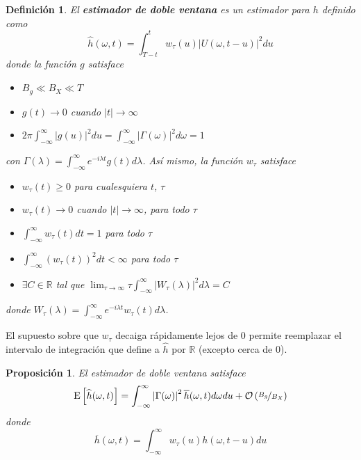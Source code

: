 \documentclass[12pt,letterpaper]{book}
\newtheorem{definicion}{Definición}[chapter]
\newtheorem{proposicion}[teorema]{Proposición}
\newcommand{\R}{\mathbb{R}}
\newcommand{\intR}{\int_{-\infty}^{\infty}}
\newcommand{\E}[1]{\mathrm{E}\left[ #1 \right]}
\newcommand{\abso}[1]{\left| #1 \right|}
\newcommand{\orden}[1]{\mathcal{O}\left( #1 \right)}
\begin{document}
\begin{definicion}
El \textbf{estimador de doble ventana} es un estimador para $h$ definido como
\begin{equation}
\widehat{h}(\omega, t) = \int_{T-t}^{t} w_\tau (u) \abso{U(\omega,t-u)}^{2} du
\end{equation}
donde la función $g$ satisface
\begin{itemize}
\item $B_g \ll B_X \ll T$
\item $g(t) \rightarrow 0$ cuando $\abso{t} \rightarrow \infty$
\item $2\pi \intR \abso{g(u)}^{2} du = \intR \abso{\Gamma(\omega)}^{2} d\omega = 1$
\end{itemize}
con $\Gamma(\lambda) = \intR e^{-i \lambda t} g(t) d\lambda$. Así mismo, la función $w_\tau$ satisface
\begin{itemize}
\item $w_\tau(t) \geq 0$ para cualesquiera $t$, $\tau$
\item $w_\tau(t) \rightarrow 0$ cuando $\abso{t} \rightarrow \infty$, para todo $\tau$
\item $\displaystyle \intR w_\tau(t) dt = 1$ para todo $\tau$
\item $\displaystyle \intR \left( w_\tau(t) \right)^{2} dt < \infty$ para todo $\tau$
\item $\exists C \in \R$ tal que  
$\displaystyle \lim_{\tau\rightarrow\infty} \tau \intR \abso{ W_{\tau}(\lambda) }^{2} d\lambda = C$
\end{itemize}
donde $W_\tau(\lambda) = \intR e^{-i \lambda t} w_\tau(t) d\lambda$.
\end{definicion}

El supuesto sobre que $w_\tau$ decaiga rápidamente lejos de 0 permite reemplazar el intervalo de integración que define a $\widehat{h}$ por $\R$ (excepto cerca de 0). 

\begin{proposicion}
\label{lazy:med_dd}
El estimador de doble ventana satisface
\begin{equation}
\E{\widehat{h}(\omega, t)} = \intR \abso{\Gamma(\omega)}^{2} \overline{h}(\omega,t) d\omega du +
\orden{\nicefrac{B_g}{B_X}}
\end{equation}
donde
\begin{equation}
\overline{h}(\omega,t) = \intR w_\tau (u) h(\omega, t-u) du
\end{equation}
\end{proposicion}
\end{document}
